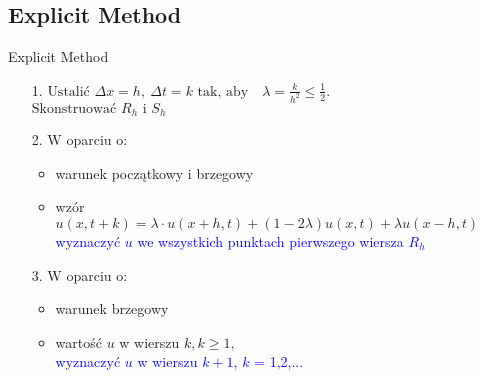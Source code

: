 
\subsection{Explicit Method}
\begin{frame}{Explicit Method}

\begin{block}{}
\begin{flushleft}
    \begin{enumerate}
      \item [1.]  
   $\text{Ustalić } \Delta x = h , \ \Delta t = k \text{ tak, aby} \quad \lambda = \frac{k}{h^2} \leq \frac{1}{2} . $\\ $\text{Skonstruować } R_h \text{ i } S_h $
      
      \item [2.] W oparciu o: \begin{itemize}
\item warunek początkowy i brzegowy
\item wzór $u(x, t+k) = \lambda \cdot u(x+h, t) + (1 - 2\lambda) u (x,t) + \lambda u(x-h, t)$ \\
\textcolor{blue}{wyznaczyć $u$ we wszystkich punktach pierwszego wiersza $R_h$}
\end{itemize} 
	\item [3.] W oparciu o:
\begin{itemize}
\item warunek brzegowy
\item wartość $u$ w wierszu $k, k \geq 1, $ \\
\textcolor{blue}{wyznaczyć $u$ w wierszu $k+1$, $k$ = 1,2,...}
\end{itemize}
    \end{enumerate}
\end{flushleft}
  \end{block}

 
\end{frame}
